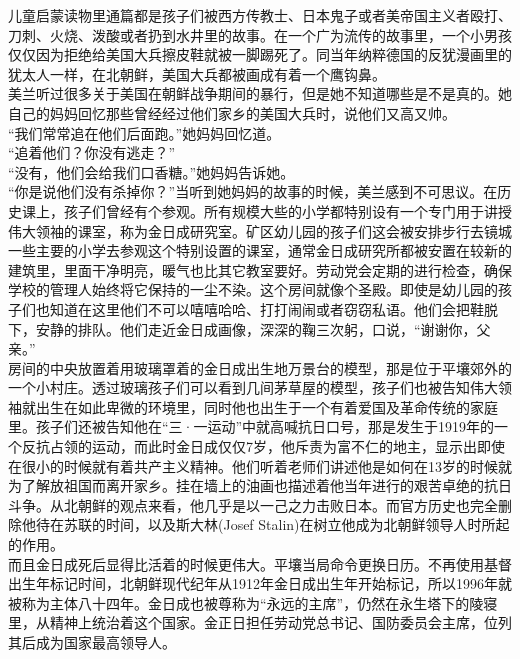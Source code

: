 \begin{multicols}{\theparacolNo}
儿童启蒙读物里通篇都是孩子们被西方传教士、日本鬼子或者美帝国主义者殴打、刀刺、火烧、泼酸或者扔到水井里的故事。在一个广为流传的故事里，一个小男孩仅仅因为拒绝给美国大兵擦皮鞋就被一脚踢死了。同当年纳粹德国的反犹漫画里的犹太人一样，在北朝鲜，美国大兵都被画成有着一个鹰钩鼻。\\

美兰听过很多关于美国在朝鲜战争期间的暴行，但是她不知道哪些是不是真的。她自己的妈妈回忆那些曾经经过他们家乡的美国大兵时，说他们又高又帅。\\

“我们常常追在他们后面跑。”她妈妈回忆道。\\

“追着他们？你没有逃走？”\\

“没有，他们会给我们口香糖。”她妈妈告诉她。\\

“你是说他们没有杀掉你？”当听到她妈妈的故事的时候，美兰感到不可思议。在历史课上，孩子们曾经有个参观。所有规模大些的小学都特别设有一个专门用于讲授伟大领袖的课室，称为金日成研究室。矿区幼儿园的孩子们这会被安排步行去镜城一些主要的小学去参观这个特别设置的课室，通常金日成研究所都被安置在较新的建筑里，里面干净明亮，暖气也比其它教室要好。劳动党会定期的进行检查，确保学校的管理人始终将它保持的一尘不染。这个房间就像个圣殿。即使是幼儿园的孩子们也知道在这里他们不可以嘻嘻哈哈、打打闹闹或者窃窃私语。他们会把鞋脱下，安静的排队。他们走近金日成画像，深深的鞠三次躬，口说，“谢谢你，父亲。”\\

房间的中央放置着用玻璃罩着的金日成出生地万景台的模型，那是位于平壤郊外的一个小村庄。透过玻璃孩子们可以看到几间茅草屋的模型，孩子们也被告知伟大领袖就出生在如此卑微的环境里，同时他也出生于一个有着爱国及革命传统的家庭里。孩子们还被告知他在“三·一运动”中就高喊抗日口号，那是发生于1919年的一个反抗占领的运动，而此时金日成仅仅7岁，他斥责为富不仁的地主，显示出即使在很小的时候就有着共产主义精神。他们听着老师们讲述他是如何在13岁的时候就为了解放祖国而离开家乡。挂在墙上的油画也描述着他当年进行的艰苦卓绝的抗日斗争。从北朝鲜的观点来看，他几乎是以一己之力击败日本。而官方历史也完全删除他待在苏联的时间，以及斯大林(Josef Stalin)在树立他成为北朝鲜领导人时所起的作用。\\

而且金日成死后显得比活着的时候更伟大。平壤当局命令更换日历。不再使用基督出生年标记时间，北朝鲜现代纪年从1912年金日成出生年开始标记，所以1996年就被称为主体八十四年。金日成也被尊称为“永远的主席”，仍然在永生塔下的陵寝里，从精神上统治着这个国家。金正日担任劳动党总书记、国防委员会主席，位列其后成为国家最高领导人。\\


\end{multicols}
